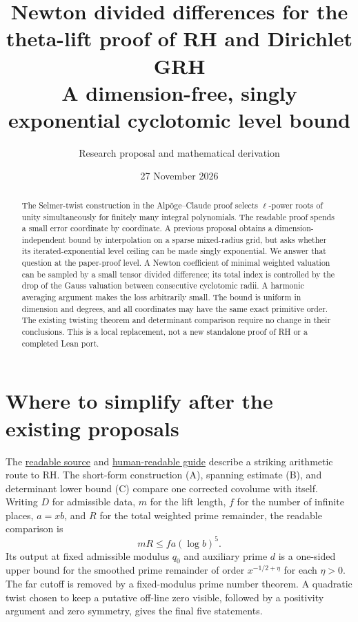 \documentclass[11pt]{article}
\title{\vspace{-1.5cm}\textcolor{ink}{\bfseries Newton divided differences for the\\ theta-lift proof of RH and Dirichlet GRH}\\[6pt]\large A dimension-free, singly exponential cyclotomic level bound}
\author{Research proposal and mathematical derivation}
\date{27 November 2026}
\begin{document}
\maketitle
\begin{abstract}
The Selmer-twist construction in the Alp\"oge--Claude proof selects $\ell$-power roots of unity simultaneously for finitely many integral polynomials. The readable proof spends a small error coordinate by coordinate. A previous proposal obtains a dimension-independent bound by interpolation on a sparse mixed-radius grid, but asks whether its iterated-exponential level ceiling can be made singly exponential. We answer that question at the paper-proof level. A Newton coefficient of minimal weighted valuation can be sampled by a small tensor divided difference; its total index is controlled by the drop of the Gauss valuation between consecutive cyclotomic radii. A harmonic averaging argument makes the loss arbitrarily small. The bound is uniform in dimension and degrees, and all coordinates may have the same exact primitive order. The existing twisting theorem and determinant comparison require no change in their conclusions. This is a local replacement, not a new standalone proof of RH or a completed Lean port.
\end{abstract}
\tableofcontents
\section{Where to simplify after the existing proposals}
The \href{https://github.com/VladimirReshetnikov/ProveIt/tree/ef7d441dcb37ea944b7ac15731bb766f2e1354ea/Analysis/GeneralizedRiemannHypothesis/Lean/grh}{readable source} and \href{https://github.com/VladimirReshetnikov/ProveIt/tree/ef7d441dcb37ea944b7ac15731bb766f2e1354ea/Analysis/GeneralizedRiemannHypothesis/docs/guide}{human-readable guide} describe a striking arithmetic route to RH. The short-form construction (A), spanning estimate (B), and determinant lower bound (C) compare one corrected covolume with itself. Writing $D$ for admissible data, $m$ for the lift length, $f$ for the number of infinite places, $a=xb$, and $R$ for the total weighted prime remainder, the readable comparison is
\begin{equation}\label{eq:star} mR\le f a(\log b)^5.\end{equation}
Its output at fixed admissible modulus $q_0$ and auxiliary prime $d$ is a one-sided upper bound for the smoothed prime remainder of order $x^{-1/2+\eta}$ for each $\eta>0$. The far cutoff is removed by a fixed-modulus prime number theorem. A quadratic twist chosen to keep a putative off-line zero visible, followed by a positivity argument and zero symmetry, gives the final five statements.
\end{document}
